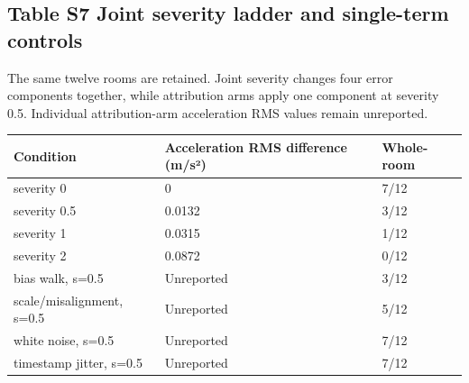 \documentclass[10pt,letterpaper]{article}
\begin{document}
\begin{minipage}{\linewidth}\subsection*{Table S7 Joint severity ladder and single-term controls}


The same twelve rooms are retained. Joint severity changes four error
components together, while attribution arms apply one component at
severity 0.5. Individual attribution-arm acceleration RMS values remain
unreported.



\begin{center}\small\begin{tabular}{@{}p{}p{}p{}@{}}\toprule
\textbf{Condition} & \textbf{Acceleration RMS difference (m/s²)} & \textbf{Whole-room} \\ \midrule
severity 0 & 0 & 7/12 \\
severity 0.5 & 0.0132 & 3/12 \\
severity 1 & 0.0315 & 1/12 \\
severity 2 & 0.0872 & 0/12 \\
bias walk, s=0.5 & Unreported & 3/12 \\
scale/misalignment, s=0.5 & Unreported & 5/12 \\
white noise, s=0.5 & Unreported & 7/12 \\
timestamp jitter, s=0.5 & Unreported & 7/12 \\
\bottomrule\end{tabular}\end{center}
\end{minipage}\par\medskip
\end{document}
